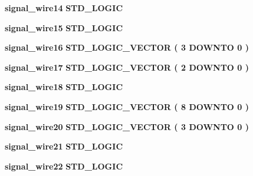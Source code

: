 \begin{DoxyCompactItemize}
\item 
{\bf signal\+\_\+wire14} {\bfseries \textcolor{comment}{S\+T\+D\+\_\+\+L\+O\+G\+IC}\textcolor{vhdlchar}{ }} 
\item 
{\bf signal\+\_\+wire15} {\bfseries \textcolor{comment}{S\+T\+D\+\_\+\+L\+O\+G\+IC}\textcolor{vhdlchar}{ }} 
\item 
{\bf signal\+\_\+wire16} {\bfseries \textcolor{comment}{S\+T\+D\+\_\+\+L\+O\+G\+I\+C\+\_\+\+V\+E\+C\+T\+OR}\textcolor{vhdlchar}{ }\textcolor{vhdlchar}{(}\textcolor{vhdlchar}{ }\textcolor{vhdlchar}{ } \textcolor{vhdldigit}{3} \textcolor{vhdlchar}{ }\textcolor{keywordflow}{D\+O\+W\+N\+TO}\textcolor{vhdlchar}{ }\textcolor{vhdlchar}{ } \textcolor{vhdldigit}{0} \textcolor{vhdlchar}{ }\textcolor{vhdlchar}{)}\textcolor{vhdlchar}{ }} 
\item 
{\bf signal\+\_\+wire17} {\bfseries \textcolor{comment}{S\+T\+D\+\_\+\+L\+O\+G\+I\+C\+\_\+\+V\+E\+C\+T\+OR}\textcolor{vhdlchar}{ }\textcolor{vhdlchar}{(}\textcolor{vhdlchar}{ }\textcolor{vhdlchar}{ } \textcolor{vhdldigit}{2} \textcolor{vhdlchar}{ }\textcolor{keywordflow}{D\+O\+W\+N\+TO}\textcolor{vhdlchar}{ }\textcolor{vhdlchar}{ } \textcolor{vhdldigit}{0} \textcolor{vhdlchar}{ }\textcolor{vhdlchar}{)}\textcolor{vhdlchar}{ }} 
\item 
{\bf signal\+\_\+wire18} {\bfseries \textcolor{comment}{S\+T\+D\+\_\+\+L\+O\+G\+IC}\textcolor{vhdlchar}{ }} 
\item 
{\bf signal\+\_\+wire19} {\bfseries \textcolor{comment}{S\+T\+D\+\_\+\+L\+O\+G\+I\+C\+\_\+\+V\+E\+C\+T\+OR}\textcolor{vhdlchar}{ }\textcolor{vhdlchar}{(}\textcolor{vhdlchar}{ }\textcolor{vhdlchar}{ } \textcolor{vhdldigit}{8} \textcolor{vhdlchar}{ }\textcolor{keywordflow}{D\+O\+W\+N\+TO}\textcolor{vhdlchar}{ }\textcolor{vhdlchar}{ } \textcolor{vhdldigit}{0} \textcolor{vhdlchar}{ }\textcolor{vhdlchar}{)}\textcolor{vhdlchar}{ }} 
\item 
{\bf signal\+\_\+wire20} {\bfseries \textcolor{comment}{S\+T\+D\+\_\+\+L\+O\+G\+I\+C\+\_\+\+V\+E\+C\+T\+OR}\textcolor{vhdlchar}{ }\textcolor{vhdlchar}{(}\textcolor{vhdlchar}{ }\textcolor{vhdlchar}{ } \textcolor{vhdldigit}{3} \textcolor{vhdlchar}{ }\textcolor{keywordflow}{D\+O\+W\+N\+TO}\textcolor{vhdlchar}{ }\textcolor{vhdlchar}{ } \textcolor{vhdldigit}{0} \textcolor{vhdlchar}{ }\textcolor{vhdlchar}{)}\textcolor{vhdlchar}{ }} 
\item 
{\bf signal\+\_\+wire21} {\bfseries \textcolor{comment}{S\+T\+D\+\_\+\+L\+O\+G\+IC}\textcolor{vhdlchar}{ }} 
\item 
{\bf signal\+\_\+wire22} {\bfseries \textcolor{comment}{S\+T\+D\+\_\+\+L\+O\+G\+IC}\textcolor{vhdlchar}{ }} 

\end{DoxyCompactItemize}
